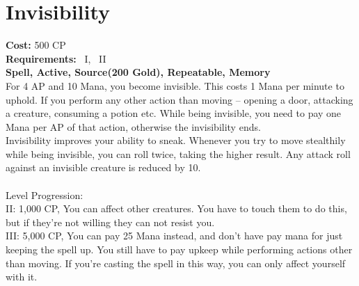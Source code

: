 \section{Invisibility}\label{spell:invisibility}
\textbf{Cost:} 500 CP\\
\textbf{Requirements:}~ I,~ II\\
\textbf{Spell, Active, Source(200 Gold), Repeatable, Memory}\\
For 4 AP and 10 Mana, you become invisible.
This costs 1 Mana per minute to uphold.
If you perform any other action than moving -- opening a door, attacking a creature, consuming a potion etc.
While being invisible, you need to pay one Mana per AP of that action, otherwise the invisibility ends.\\
Invisibility improves your ability to sneak.
Whenever you try to move stealthily while being invisible, you can roll twice, taking the higher result.
Any attack roll against an invisible creature is reduced by 10.\\
\\
Level Progression:\\
II: 1,000 CP, You can affect other creatures.
You have to touch them to do this, but if they're not willing they can not resist you.\\

III: 5,000 CP, You can pay 25 Mana instead, and don't have pay mana for just keeping the spell up.
You still have to pay upkeep while performing actions other than moving.
If you're casting the spell in this way, you can only affect yourself with it.\\